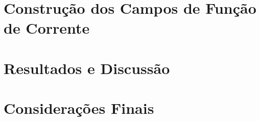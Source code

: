 \documentclass[12pt,portuguese,a4paper,pdftex]{report}
\begin{document}
\newpage
\chapter{Construção dos Campos de Função de Corrente}\label{cap:funccorr}


\newpage
\chapter{Resultados e  Discussão}\label{cap:resultados}


\newpage
\chapter{Considerações Finais}\label{cap:consideracoes}


% 

\newpage
{}


\end{document}
